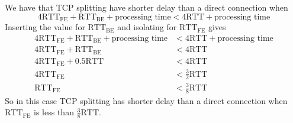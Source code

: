 We have that TCP splitting have shorter delay than a direct connection when 
\begin{equation*}
    4 \text{RTT}_{\text{FE}} + \text{RTT}_{\text{BE}} + \text{processing time} < 4 \text{RTT} + \text{processing time}
\end{equation*}    
Inserting the value for $\text{RTT}_{\text{BE}}$ and isolating for $\text{RTT}_{\text{FE}}$ gives
\begin{equation*}
\begin{split}
    4 \text{RTT}_{\text{FE}} + \text{RTT}_{\text{BE}} + \text{processing time} &< 4 \text{RTT} + \text{processing time} \\
    4 \text{RTT}_{\text{FE}} + \text{RTT}_{\text{BE}}  &< 4 \text{RTT} \\
    4 \text{RTT}_{\text{FE}} + 0.5 \text{RTT}  &< 4 \text{RTT} \\
    4 \text{RTT}_{\text{FE}} &< \frac{3}{2} \text{RTT} \\
    \text{RTT}_{\text{FE}} &< \frac{3}{8} \text{RTT} 
\end{split}
\end{equation*}
So in this case TCP splitting has shorter delay than a direct connection when $\text{RTT}_{\text{FE}}$ is less than $\frac{3}{8} \text{RTT}$.